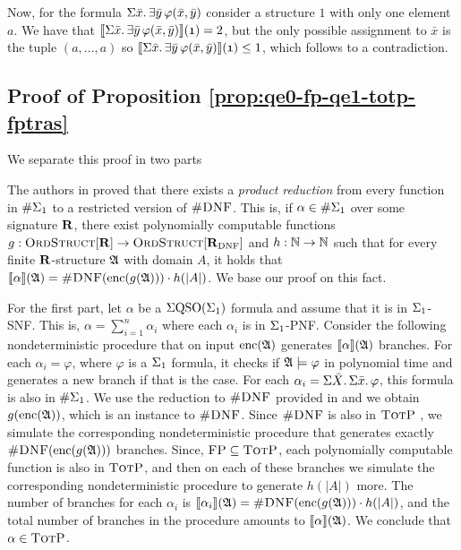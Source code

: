 Now, for the formula $\Sigma{\bar{x}}.\,\exists\bar{y}\,\varphi(\bar{x},\bar{y})$ consider a structure $\mathfrak{1}$ with only one element $a$. We have that ${\llbracket{}{\Sigma{\bar{x}}.\,\exists\bar{y}\,\varphi(\bar{x},\bar{y})}\rrbracket}(\mathfrak{1}) = 2$, but the only possible assignment to $\bar{x}$ is the tuple $(a,\ldots,a)$ so ${\llbracket{}{\Sigma{\bar{x}}.\,\exists\bar{y}\,\varphi(\bar{x},\bar{y})}\rrbracket}(\mathfrak{1}) \leq 1$, which follows to a contradiction.

\subsection*{Proof of Proposition \ref{prop:qe0-fp-qe1-totp-fptras}}

We separate this proof in two parts

\vspace{1em}
The authors in \cite{SalujaST95} proved that there exists a {\em product reduction} from every function in $\#\Sigma_{1}$ to a restricted version of $\textsc{\#DNF}$. This is, if $\alpha\in\#\Sigma_{1}$ over some signature $\mathbf{R}$, there exist polynomially computable functions $g:\text{\sc OrdStruct}[\mathbf{R}]\to\text{\sc OrdStruct}[\mathbf{R}_{\text{DNF}}]$ and $h:\mathbb{N}\to\mathbb{N}$ such that for every finite $\mathbf{R}$-structure $\mathfrak{A}$ with domain $A$, it holds that ${\llbracket{}{\alpha}\rrbracket}(\mathfrak{A}) = \textsc{\#DNF}({\rm enc}(g(\mathfrak{A})))\cdot h(\vert A \vert)$. We base our proof on this fact.

For the first part, let $\alpha$ be a $\Sigma{\rm QSO}(\Sigma_{1})$ formula and assume that it is in $\Sigma_{1}$-SNF. This is, $\alpha = \sum_{i = 1}^n\alpha_i$ where each $\alpha_i$ is in $\Sigma_{1}$-PNF. Consider the following nondeterministic procedure that on input ${\rm enc}(\mathfrak{A})$ generates ${\llbracket{}{\alpha}\rrbracket}(\mathfrak{A})$ branches. For each $\alpha_i = \varphi$, where $\varphi$ is a $\Sigma_{1}$ formula, it checks if $\mathfrak{A}\models\varphi$ in polynomial time and generates a new branch if that is the case. For each $\alpha_i = \Sigma{\bar{X}}.\,\Sigma{\bar{x}}.\,\varphi$, this formula is also in $\#\Sigma_{1}$. We use the reduction to $\textsc{\#DNF}$ provided in \cite{SalujaST95} and we obtain $g({\rm enc}(\mathfrak{A}))$, which is an instance to $\textsc{\#DNF}$. Since $\textsc{\#DNF}$ is also in $\text{\sc TotP}$ \cite{PagourtzisZ06}, we simulate the corresponding nondeterministic procedure that generates exactly $\textsc{\#DNF}({\rm enc}(g(\mathfrak{A})))$ branches. Since, $\text{\sc FP}\subseteq\text{\sc TotP}$\cite{PagourtzisZ06}, each polynomially computable function is also in $\text{\sc TotP}$, and then on each of these branches we simulate the corresponding nondeterministic procedure to generate $h(\vert A \vert)$ more. The number of branches for each $\alpha_i$ is ${\llbracket{}{\alpha_i}\rrbracket}(\mathfrak{A}) = \textsc{\#DNF}({\rm enc}(g(\mathfrak{A})))\cdot h(\vert A \vert)$, and the total number of branches in the procedure amounts to ${\llbracket{}{\alpha}\rrbracket}(\mathfrak{A})$. We conclude that $\alpha\in\text{\sc TotP}$.

